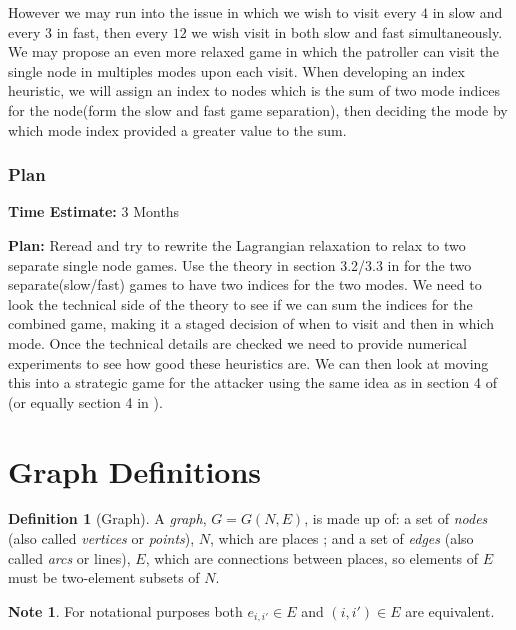 \documentclass[a4paper,10pt]{article}
\theoremstyle{definition}
\newtheorem{definition}[theorem]{Definition}
\theoremstyle{definition}
\theoremstyle{remark}
\theoremstyle{definition}
\newtheorem*{note}{Note}
\begin{document}
However we may run into the issue in which we wish to visit every $4$ in slow and every $3$ in fast, then every $12$ we wish visit in both slow and fast simultaneously. We may propose an even more relaxed game in which the patroller can visit the single node in multiples modes upon each visit. When developing an index heuristic, we will assign an index to nodes which is the sum of two mode indices for the node(form the slow and fast game separation), then deciding the mode by which mode index provided a greater value to the sum.

\subsubsection{Plan}
\textbf{Time Estimate:} 3 Months

\textbf{Plan:} Reread \cite{Lin2014} and try to rewrite the Lagrangian relaxation to relax to two separate single node games. Use the theory in section 3.2/3.3 in \cite{Lin2014} for the two separate(slow/fast) games to have two indices for the two modes. We need to look the technical side of the theory to see if we can sum the indices for the combined game, making it a staged decision of when to visit and then in which mode. Once the technical details are checked we need to provide numerical experiments to see how good these heuristics are. We can then look at moving this into a strategic game for the attacker using the same idea as in section 4 of \cite{Lin2014}(or equally section 4 in \cite{Lin2013}).




\newpage
\appendix
{}
\appendixpage
\addappheadtotoc
\section{Graph Definitions}
\label{Appendix:Graph Definitions}
\begin{definition}[Graph]
A \textit{graph}, $G=G(N,E)$, is made up of: a set of \textit{nodes} (also called \textit{vertices} or \textit{points}), $N$, which are places ; and a set of \textit{edges} (also called \textit{arcs} or lines), $E$, which are connections between places, so elements of $E$ must be two-element subsets of $N$.
\end{definition}

\begin{note}
For notational purposes both $e_{i,i'} \in E$ and $(i,i') \in E$ are equivalent.
\end{note}
\end{document}
